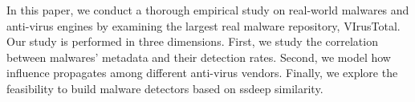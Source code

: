 In this paper, we conduct a thorough empirical study on real-world malwares and anti-virus 
engines by examining the largest real malware repository, VIrusTotal. 
Our study is performed in three dimensions.
First, we study the correlation between malwares’ metadata and their detection rates. 
Second, we model how influence propagates among different anti-virus vendors. 
Finally, we explore the feasibility to build malware detectors based on ssdeep similarity. 
